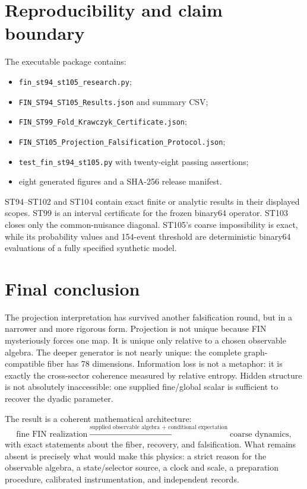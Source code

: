 \documentclass[11pt,a4paper]{article}
\begin{document}
\section{Reproducibility and claim boundary}

The executable package contains:
\begin{itemize}
\item \texttt{fin\_st94\_st105\_research.py};
\item \texttt{FIN\_ST94\_ST105\_Results.json} and summary CSV;
\item \texttt{FIN\_ST99\_Fold\_Krawczyk\_Certificate.json};
\item \texttt{FIN\_ST105\_Projection\_Falsification\_Protocol.json};
\item \texttt{test\_fin\_st94\_st105.py} with twenty-eight passing assertions;
\item eight generated figures and a SHA-256 release manifest.
\end{itemize}

ST94--ST102 and ST104 contain exact finite or analytic results in their displayed scopes. ST99 is an interval certificate for the frozen binary64 operator. ST103 closes only the common-nuisance diagonal. ST105's coarse impossibility is exact, while its probability values and 154-event threshold are deterministic binary64 evaluations of a fully specified synthetic model.

\section{Final conclusion}

The projection interpretation has survived another falsification round, but in a narrower and more rigorous form. Projection is not unique because FIN mysteriously forces one map. It is unique only relative to a chosen observable algebra. The deeper generator is not nearly unique: the complete graph-compatible fiber has 78 dimensions. Information loss is not a metaphor: it is exactly the cross-sector coherence measured by relative entropy. Hidden structure is not absolutely inaccessible: one supplied fine/global scalar is sufficient to recover the dyadic parameter.

The result is a coherent mathematical architecture:
\[
\text{fine FIN realization}
\xrightarrow{\text{supplied observable algebra + conditional expectation}}
\text{coarse dynamics},
\]
with exact statements about the fiber, recovery, and falsification. What remains absent is precisely what would make this physics: a strict reason for the observable algebra, a state/selector source, a clock and scale, a preparation procedure, calibrated instrumentation, and independent records.
\end{document}

